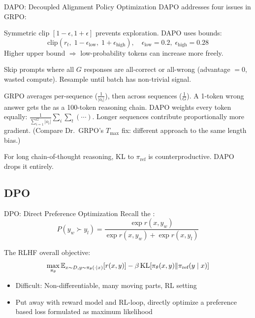 \begin{frame}{DAPO: Decoupled Alignment Policy Optimization}
  DAPO \cite{yu2025dapo} addresses four issues in GRPO:

  \begin{description}[nosep]
    \item[Decoupled Clipping:] Symmetric clip $[1{-}\epsilon, 1{+}\epsilon]$ prevents exploration.
      DAPO uses  bounds:
      \[
        \text{clip}(r_t,\; 1 - \epsilon_\text{low},\; 1 + \epsilon_\text{high}), \quad \epsilon_\text{low} = 0.2,\; \epsilon_\text{high} = 0.28
      \]
      Higher upper bound $\Rightarrow$ low-probability tokens can increase more freely.
    \item[Dynamic Sampling:] Skip prompts where all $G$ responses are all-correct or all-wrong (advantage $= 0$, wasted compute). Resample until batch has non-trivial signal.
    \item[Token-Level Averaging:] GRPO averages per-sequence ($\frac{1}{|o_i|}$), then across sequences ($\frac{1}{G}$).
      A 1-token wrong answer gets the  as a 100-token reasoning chain.
      DAPO weights every token equally: $\frac{1}{\sum_{i=1}^G |o_i|} \sum_{i} \sum_{t} (\cdots)$.
      Longer sequences contribute proportionally more gradient.
      (Compare Dr.\ GRPO's $T_\text{max}$ fix: different approach to the same length bias.)
    \item[No KL Penalty:] For long chain-of-thought reasoning, KL to $\pi_\text{ref}$ is counterproductive. DAPO drops it entirely.
  \end{description}
\end{frame}

\subsection{DPO}

\begin{frame}{DPO: Direct Preference Optimization}
  Recall the  \cite{rafailov2024dpo}:
  \[
    P(y_w \succ y_l) = \frac{\exp r(x, y_w)}{\exp r(x, y_w) + \exp r(x, y_l)}
  \]

  The RLHF overall objective:
  \[
    \max_{\pi_\theta} \mathbb{E}_{x \sim D, y \sim \pi_\theta(\cdot|x)}[r(x, y)] - \beta\,\text{KL}[\pi_\theta(x, y) \| \pi_\text{ref}(y \mid x)]
  \]

  \begin{itemize}
    \item Difficult: Non-differentiable, many moving parts, RL setting
    \item {} Put away with reward model and RL-loop, directly optimize a preference based loss formulated as maximum likelihood
  \end{itemize}
\end{frame}

